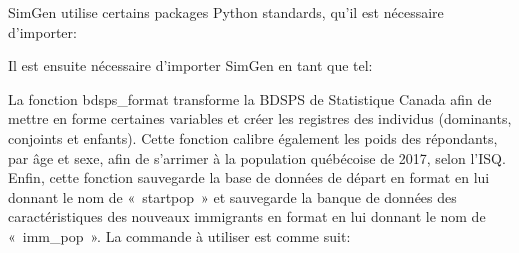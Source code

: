 \documentclass[letterpaper,10pt,french]{sphinxmanual}
\begin{document}

SimGen utilise certains packages Python standards, qu’il est nécessaire d’importer:

\begin{sphinxVerbatim}[commandchars=\\\{\}]
 
   
   
     
\end{sphinxVerbatim}


Il est ensuite nécessaire d’importer SimGen en tant que tel:

\begin{sphinxVerbatim}[commandchars=\\\{\}]
 
     
\end{sphinxVerbatim}


La fonction bdsps\_format transforme la BDSPS de Statistique Canada afin de mettre en forme certaines variables et créer les registres des individus (dominants, conjoints et enfants).
Cette fonction calibre également les poids des répondants, par âge et sexe, afin de s’arrimer à la population québécoise de 2017, selon l’ISQ.
Enfin, cette fonction sauvegarde la base de données de départ en format  en lui donnant le nom de « startpop » et
sauvegarde la banque de données des caractéristiques des nouveaux immigrants en format  en lui donnant le nom de « imm\_pop ».
La commande à utiliser est comme suit:

\begin{sphinxVerbatim}[commandchars=\\\{\}]
\end{sphinxVerbatim}
\end{document}
